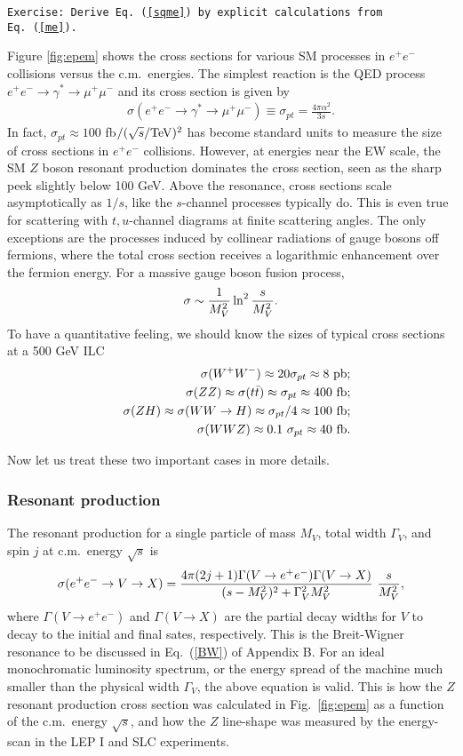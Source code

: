 \documentclass[prd,aps,floats,preprintnumbers,preprint,superscriptaddress,floatfix,nofootinbib]{revtex4}
\def\epem{e^+e^-}
\def\pb{{\rm pb}}
\def\fb{{\rm fb}}
\def\be{\begin{equation}}
\def\ee{\end{equation}}
\def\bea{\begin{eqnarray}}
\def\eea{\end{eqnarray}}
\begin{document}
{
\vskip 0.2cm
\noindent
\tt Exercise: Derive Eq.~(\ref{sqme}) by explicit calculations
from Eq.~(\ref{me}).
\vskip 0.2cm
}

Figure \ref{fig:epem} shows the cross sections for various SM processes
in $\epem$ collisions versus the c.m.~energies. 
The simplest reaction  is the QED process 
$e^+e^-\to\gamma^*\to \mu^+\mu^-$ and its cross section is given by
\bea
{\sigma(e^+e^-\to \gamma^*\to \mu^+\mu^-)\equiv \sigma_{pt}= \frac{4\pi\alpha^2}{3 s}  }.
\eea
In fact, $\sigma_{pt}\approx 100$ fb$/(\sqrt s/{\rm TeV})^2$ 
has become  standard units to measure the size of cross sections
in $e^+e^-$ collisions. However, at energies near the EW scale,  the SM $Z$ boson resonant
production dominates the cross section, seen  as the sharp peek 
slightly below 100 GeV. Above
the resonance, cross sections scale asymptotically as $1/s$, like the 
$s$-channel processes typically do. This is even true for scattering 
with $t,u$-channel diagrams at finite scattering angles. 
The only exceptions are the processes induced by collinear radiations of gauge
bosons off fermions, 
where the total cross section receives a logarithmic enhancement over the 
fermion energy.  For a massive gauge boson fusion process,
\be
\sigma \sim {1\over M^2_V}\ln^2{s\over M_V^2}.
\ee
To have a quantitative feeling, we should know the sizes of typical cross sections
at a 500 GeV ILC
\bea
\nonumber
&&\sigma(W^+W^-) \approx 20\sigma_{pt} \approx 8\ \pb;\\
\nonumber
&&\sigma(ZZ) \approx \sigma(t\bar t) \approx \sigma_{pt} \approx 400\ \fb;\\
\nonumber
&&\sigma(ZH) \approx \sigma(WW\to H) \approx \sigma_{pt}/4 \approx 100\ \fb;\\
\nonumber
&& \sigma(WWZ) \approx 0.1\ \sigma_{pt} \approx 40\ \fb.
\eea

Now let us treat these two important cases in more details.

\subsubsection{Resonant production}
The resonant production for a single particle of mass $M_V$, total width $\Gamma_V$, 
and spin $j$ at c.m.~energy $\sqrt s$ is 
\bea
\sigma(e^+e^-\to V \to X) 
= \frac{4\pi(2j+1)\Gamma(V\to \epem)\Gamma(V\to X)} 
{(s-M^2_V)^2 + \Gamma_V^2 M_V^2} \ {s\over M_V^2},
\label{reson}
\eea 
where $\Gamma(V\to \epem)$ and $\Gamma(V\to X)$ are the partial decay widths
for $V$ to decay to the initial and final sates, respectively. 
This is the Breit-Wigner resonance to be discussed in Eq.~(\ref{BW}) of 
Appendix B. 
For an ideal monochromatic luminosity spectrum,
or the energy spread of the machine much smaller than the physical width $\Gamma_V$,
the above equation is valid.  This  is how the $Z$ 
resonant production cross section was calculated in Fig.~\ref{fig:epem}
as a function of the c.m.~energy $\sqrt s$, and
how the $Z$ line-shape was measured by the energy-scan 
in the LEP I and SLC experiments. 
\end{document}

